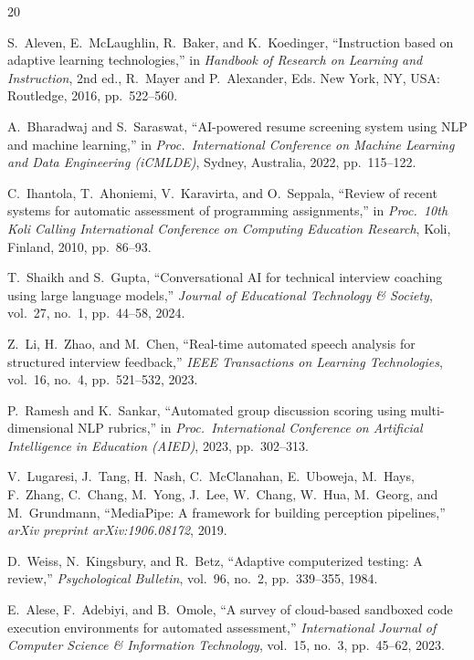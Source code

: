 \documentclass[12pt,a4paper]{report}
\begin{document}
\begin{thebibliography}{20}

S.~Aleven, E.~McLaughlin, R.~Baker, and K.~Koedinger,
``Instruction based on adaptive learning technologies,''
in \textit{Handbook of Research on Learning and Instruction}, 2nd ed., R.~Mayer and P.~Alexander, Eds.
New York, NY, USA: Routledge, 2016, pp.~522--560.

A.~Bharadwaj and S.~Saraswat,
``AI-powered resume screening system using NLP and machine learning,''
in \textit{Proc.\ International Conference on Machine Learning and Data Engineering (iCMLDE)}, Sydney, Australia, 2022, pp.~115--122.

C.~Ihantola, T.~Ahoniemi, V.~Karavirta, and O.~Seppala,
``Review of recent systems for automatic assessment of programming assignments,''
in \textit{Proc.\ 10th Koli Calling International Conference on Computing Education Research}, Koli, Finland, 2010, pp.~86--93.

T.~Shaikh and S.~Gupta,
``Conversational AI for technical interview coaching using large language models,''
\textit{Journal of Educational Technology \& Society}, vol.~27, no.~1, pp.~44--58, 2024.

Z.~Li, H.~Zhao, and M.~Chen,
``Real-time automated speech analysis for structured interview feedback,''
\textit{IEEE Transactions on Learning Technologies}, vol.~16, no.~4, pp.~521--532, 2023.

P.~Ramesh and K.~Sankar,
``Automated group discussion scoring using multi-dimensional NLP rubrics,''
in \textit{Proc.\ International Conference on Artificial Intelligence in Education (AIED)}, 2023, pp.~302--313.

V.~Lugaresi, J.~Tang, H.~Nash, C.~McClanahan, E.~Uboweja, M.~Hays, F.~Zhang, C.~Chang, M.~Yong, J.~Lee, W.~Chang, W.~Hua, M.~Georg, and M.~Grundmann,
``MediaPipe: A framework for building perception pipelines,''
\textit{arXiv preprint arXiv:1906.08172}, 2019.

D.~Weiss, N.~Kingsbury, and R.~Betz,
``Adaptive computerized testing: A review,''
\textit{Psychological Bulletin}, vol.~96, no.~2, pp.~339--355, 1984.

E.~Alese, F.~Adebiyi, and B.~Omole,
``A survey of cloud-based sandboxed code execution environments for automated assessment,''
\textit{International Journal of Computer Science \& Information Technology}, vol.~15, no.~3, pp.~45--62, 2023.


\end{thebibliography}
\end{document}
